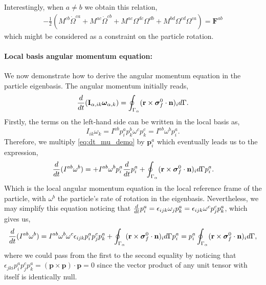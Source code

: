 Interestingly, when $a\neq b$ we obtain this relation, 
\begin{align*}
    -\frac{1}{2}(
        M^{cb} \dot{\Omega}^{ca}
        + M^{ac} \dot{\Omega}^{cb}
        + M^{ac} \Omega^{dc} \Omega^{db}  
        + M^{bd} \Omega^{cd}  \Omega^{ca}
        )
    = \textbf{F}^{ab}
\end{align*}
which might be considered as a constraint on the particle rotation. 

\paragraph{Local basis angular momentum equation:}
We now demonstrate how to derive the angular momentum equation in the particle eigenbasis. 
The angular momentum initially reads, 
\begin{equation*}
    \ddt (\textbf{I}_{\alpha,ik}\bm\omega_{\alpha,k} )
    = 
    \intS{(\textbf{r}\times\bm\sigma_f^0\cdot \textbf{n})_i} . 
    \label{eq:dt_mu_demo}
\end{equation*}
Firstly, the terms on the left-hand side can be written in the local basis as, 
\begin{equation*}
    I_{ik}\omega_{k}
    = 
    I^{ab} p_i^a p_k^b \omega^c p^c_k
    = 
    I^{ab}   \omega^b p_i^a. 
\end{equation*} 
Therefore, we multiply \ref{eq:dt_mu_demo} by $\textbf{p}_i^a$ which eventually leads us to the expression, 
\begin{equation*}
    \frac{d}{dt} (I^{ab}   \omega^b)
    = 
    + I^{ab}\omega^b p_i^a  \frac{d}{dt} p_i^a
    + \oint_{\Gamma_{\alpha}} (\textbf{r}\times\bm\sigma_f^0\cdot \textbf{n})_i d\Gamma p_i^a. 
\end{equation*}
Which is the local angular momentum equation in the local reference frame of the particle, with $\omega^b$ the particle's rate of rotation in the eigenbasis. 
Nevertheless, we may simplify this equation noticing that $\frac{d}{dt} p_i^a = \epsilon_{ijk} \omega_j p_k^a = \epsilon_{ijk} \omega^c p_j^c p_k^a$, which gives us, 
\begin{equation*}
    \frac{d}{dt} (I^{ab}   \omega^b)
    = 
    I^{ab}\omega^b  \omega^c \epsilon_{ijk} p_i^a p_j^c p_k^a
    + \oint_{\Gamma_{\alpha}} (\textbf{r}\times\bm\sigma_f^0\cdot \textbf{n})_i d\Gamma p_i^a
    = 
    p_i^a\oint_{\Gamma_{\alpha}} (\textbf{r}\times\bm\sigma_f^0\cdot \textbf{n})_i d\Gamma, 
\end{equation*}
where we could pass from the first to the second equality by noticing that $\epsilon_{jki} p_i^a p_j^c p_k^a = (\textbf{p}\times \textbf{p}) \cdot \textbf{p} = 0$ since the vector product of any unit tensor with itself is identically null. 
